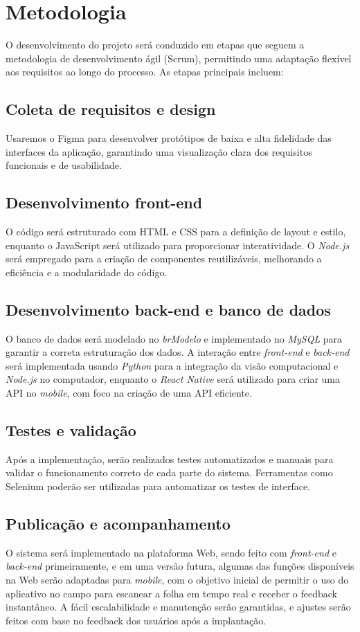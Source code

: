 \section{Metodologia}

O desenvolvimento do projeto será conduzido em etapas que seguem a metodologia de desenvolvimento ágil (Scrum), permitindo uma adaptação flexível aos requisitos ao longo do processo. As etapas principais incluem:

\subsection{Coleta de requisitos e design}
Usaremos o Figma para desenvolver protótipos de baixa e alta fidelidade das interfaces da aplicação, garantindo uma visualização clara dos requisitos funcionais e de usabilidade.

\subsection{Desenvolvimento front-end}
O código será estruturado com HTML e CSS para a definição de layout e estilo, enquanto o JavaScript será utilizado para proporcionar interatividade. O \textit{Node.js} será empregado para a criação de componentes reutilizáveis, melhorando a eficiência e a modularidade do código.

\subsection{Desenvolvimento back-end e banco de dados}
O banco de dados será modelado no \textit{brModelo} e implementado no \textit{MySQL} para garantir a correta estruturação dos dados. A interação entre \textit{front-end} e \textit{back-end} será implementada usando \textit{Python} para a integração da visão computacional e \textit{Node.js} no computador, enquanto o \textit{React Native} será utilizado para criar uma API no \textit{mobile}, com foco na criação de uma API eficiente.

\subsection{Testes e validação}
Após a implementação, serão realizados testes automatizados e manuais para validar o funcionamento correto de cada parte do sistema. Ferramentas como Selenium poderão ser utilizadas para automatizar os testes de interface.

\subsection{Publicação e acompanhamento}
O sistema será implementado na plataforma Web, sendo feito com \textit{front-end} e \textit{back-end} primeiramente, e em uma versão futura, algumas das funções disponíveis na Web serão adaptadas para \textit{mobile}, com o objetivo inicial de permitir o uso do aplicativo no campo para escanear a folha em tempo real e receber o feedback instantâneo. A fácil escalabilidade e manutenção serão garantidas, e ajustes serão feitos com base no feedback dos usuários após a implantação.